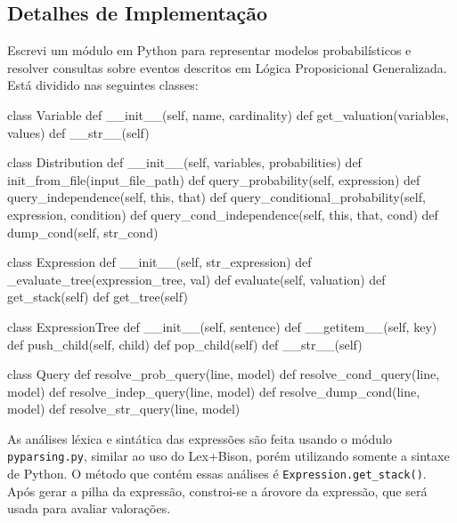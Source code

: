 \documentclass[paper=a4, fontsize=11pt]{scrartcl} %
\numberwithin{equation}{subsection}
\numberwithin{figure}{subsection}
\numberwithin{table}{subsection}
\numberwithin{definition}{subsection}
\numberwithin{theorem}{subsection}
\numberwithin{property}{subsection}
\numberwithin{proposition}{subsection}
\numberwithin{equation}{section}
\numberwithin{figure}{section}
\numberwithin{table}{section}
\numberwithin{definition}{section}
\numberwithin{theorem}{section}
\numberwithin{property}{section}
\numberwithin{proposition}{section}
\begin{document}
\subsection{Detalhes de Implementação}
Escrevi um módulo em Python para representar modelos probabilísticos e resolver consultas sobre eventos descritos em Lógica Proposicional Generalizada. Está dividido nas seguintes classes:

\begin{python}
class Variable
  def __init__(self, name, cardinality)
  def get_valuation(variables, values)
  def __str__(self)

class Distribution
  def __init__(self, variables, probabilities)
  def init_from_file(input_file_path)
  def query_probability(self, expression)
  def query_independence(self, this, that)
  def query_conditional_probability(self, expression, condition)
  def query_cond_independence(self, this, that, cond)
  def dump_cond(self, str_cond)
  
class Expression
  def __init__(self, str_expression)
  def _evaluate_tree(expression_tree, val)
  def evaluate(self, valuation)
  def get_stack(self)
  def get_tree(self)
  
class ExpressionTree
  def __init__(self, sentence)
  def __getitem__(self, key)
  def push_child(self, child)
  def pop_child(self)
  def __str__(self)

class Query
  def resolve_prob_query(line, model)
  def resolve_cond_query(line, model)
  def resolve_indep_query(line, model)
  def resolve_dump_cond(line, model)
  def resolve_str_query(line, model)
  
\end{python}



As análises léxica e sintática das expressões são feita usando o módulo \verb|pyparsing.py|, similar ao uso do Lex+Bison, porém utilizando somente a sintaxe de Python. O método que contém essas análises é \verb|Expression.get_stack()|. Após gerar a pilha da expressão, constroi-se a árovore da expressão, que será usada para avaliar valorações. 


\end{document}
